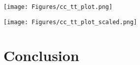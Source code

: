 \documentclass[preprint]{aastex}   %
\begin{document}
\begin{figure*}[htb!]
    \texttt{[image: Figures/cc\_tt\_plot.png]}
    \caption{The highest cross-correlation value of each pixel is plotted as a function
        of its distance from the center pixel. The color indicates the timelag
        corresponding to the maximum cross-correlation for that pixel.}
    \label{tt_all_plot}
\end{figure*}

\begin{figure*}[htb!]
    \texttt{[image: Figures/cc\_tt\_plot\_scaled.png]}
    \caption{Same as figure \ref{tt_all_plot}, but with two thirds of the timelag cut out
        at both ends.}
    \label{tt_plot}
\end{figure*}


\section{Conclusion}\label{conclusion}


\end{document}
